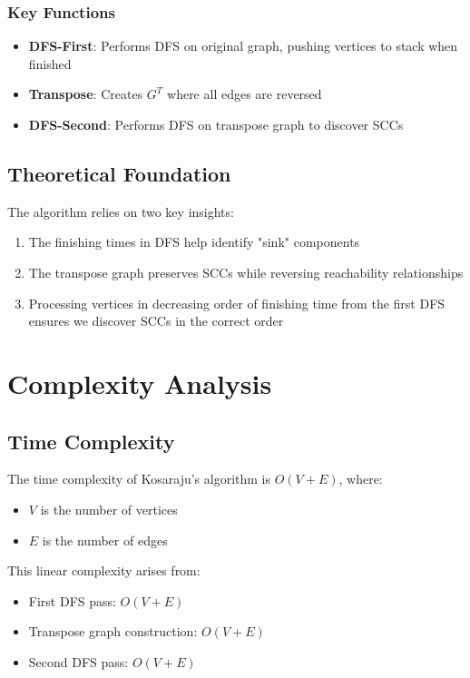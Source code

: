 \documentclass[12pt]{article}
\begin{document}
\subsubsection{Key Functions}

\begin{itemize}
    \item \textbf{DFS-First}: Performs DFS on original graph, pushing vertices to stack when finished
    \item \textbf{Transpose}: Creates $G^T$ where all edges are reversed
    \item \textbf{DFS-Second}: Performs DFS on transpose graph to discover SCCs
\end{itemize}

\subsection{Theoretical Foundation}

The algorithm relies on two key insights:
\begin{enumerate}
    \item The finishing times in DFS help identify "sink" components
    \item The transpose graph preserves SCCs while reversing reachability relationships
    \item Processing vertices in decreasing order of finishing time from the first DFS ensures we discover SCCs in the correct order
\end{enumerate}

\section{Complexity Analysis}
\subsection{Time Complexity}

The time complexity of Kosaraju's algorithm is $O(V + E)$, where:
\begin{itemize}
    \item $V$ is the number of vertices
    \item $E$ is the number of edges
\end{itemize}

This linear complexity arises from:
\begin{itemize}
    \item First DFS pass: $O(V + E)$
    \item Transpose graph construction: $O(V + E)$
    \item Second DFS pass: $O(V + E)$
\end{itemize}
\end{document}
